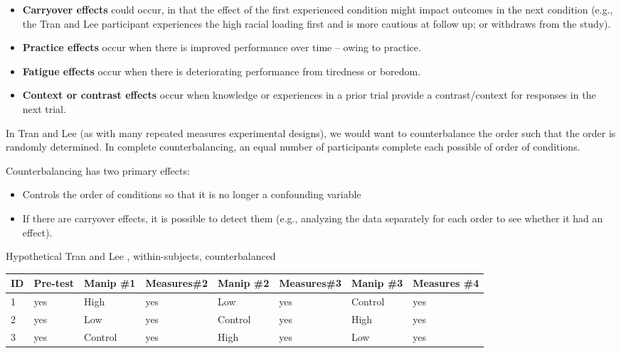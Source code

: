 \documentclass[
  english,
]{book}
\providecommand{\tightlist}{%
  \setlength{\itemsep}{0pt}\setlength{\parskip}{0pt}}
\begin{document}
\begin{itemize}
\tightlist
\item
  \textbf{Carryover effects} could occur, in that the effect of the first experienced condition might impact outcomes in the next condition (e.g., the Tran and Lee participant experiences the high racial loading first and is more cautious at follow up; or withdraws from the study).
\item
  \textbf{Practice effects} occur when there is improved performance over time -- owing to practice.
\item
  \textbf{Fatigue effects} occur when there is deteriorating performance from tiredness or boredom.
\item
  \textbf{Context or contrast effects} occur when knowledge or experiences in a prior trial provide a contrast/context for responses in the next trial.
\end{itemize}

In Tran and Lee (as with many repeated measures experimental designs), we would want to counterbalance the order such that the order is randomly determined. In complete counterbalancing, an equal number of participants complete each possible of order of conditions.

Counterbalancing has two primary effects:

\begin{itemize}
\tightlist
\item
  Controls the order of conditions so that it is no longer a confounding variable
\item
  If there are carryover effects, it is possible to detect them (e.g., analyzing the data separately for each order to see whether it had an effect).
\end{itemize}

Hypothetical Tran and Lee \citeyearpar{tran_you_2014}, within-subjects, counterbalanced

\begin{longtable}[]{@{}llllllll@{}}
\toprule
ID & Pre-test & Manip \#1 & Measures\#2 & Manip \#2 & Measures\#3 & Manip \#3 & Measures \#4 \\
\midrule
\endhead
1 & yes & High & yes & Low & yes & Control & yes \\
2 & yes & Low & yes & Control & yes & High & yes \\
3 & yes & Control & yes & High & yes & Low & yes \\
\bottomrule
\end{longtable}
\end{document}
